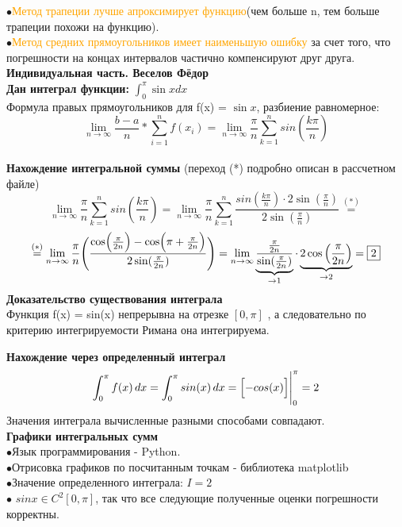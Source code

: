 \documentclass[aspectratio=169]{beamer}
\begin{document}
	$\bullet$\textcolor{orange}{Метод трапеции лучше апроксимирует функцию}(чем больше n, тем больше трапеции похожи на функцию).\\
	$\bullet$\textcolor{orange}{Метод средних прямоугольников имеет наименьшую ошибку} за счет того, что погрешности на концах интервалов частично компенсируют друг друга.
	\newpage
	\large \textbf{\textcolor{structure.fg}{Индивидуальная часть. Веселов Фёдор}}\\
	
	\textbf{Дан интеграл функции: } \(\int_{0}^{\pi}  \sin{x} dx\)\\
	Формула правых прямоугольников для f(x) = $\sin{x}$, разбиение равномерное:\\
	\[\lim_{n \to \infty}\frac{b-a}{n}*\sum_{i=1}^{n}f(x_i) = \lim_{n \to \infty}\frac{\pi}{n}\sum_{k=1}^n sin(\frac{k\pi}{n})\]\\
	\textbf{Нахождение интегральной суммы} (переход (*) подробно описан в рассчетном файле)
	\[
	\lim_{n \to \infty} \frac{\pi}{n}\sum_{k=1}^n sin(\frac{k\pi}{n}) =
	\lim_{n \to \infty} \frac{\pi}{n}\sum_{k=1}^n \frac{sin(\frac{k\pi}{n})\cdot2\sin(\frac{\pi}{n})}{2\sin(\frac{\pi}{n})} 
	\overset{(*)}{=}\]\[\overset{(*)}{=}\lim_{n \to \infty} \frac{\pi}{n}\Biggl( 
	\frac{\cos\Bigl(\frac{\pi}{2n}\Bigr) - \cos\Bigl(\pi+\frac{\pi}{2n}\Bigr)}{2\sin(\frac{\pi}{2n})} \Biggr) = \lim_{n \to \infty} \underbrace{\frac{\frac{\pi}{2n}}{\sin(\frac{\pi}{2n})}}_{\to1} \cdot 
	\underbrace{2\cos\left(\frac{\pi}{2n}\right)}_{\to 2} = \boxed{2}
	\]
	\newpage
	\textbf{Доказательство существования интеграла}\\
	Функция f(x) = sin(x) непрерывна на отрезке  $[0,\pi]$ , а следовательно по критерию интегрируемости Римана она интегрируема.
	
	\textbf{Нахождение через определенный интеграл}
	\[
	\int_0^\pi f(x) \, dx = \int_0^\pi sin(x) \, dx = \Bigl[-cos(x)\Bigr]\Bigg|_0^\pi = 2 
	\]
	Значения интеграла вычисленные разными способами совпадают.\\
	\large \textbf{\textcolor{structure.fg}{Графики интегральных сумм}}\\
		$\bullet$Язык программирования - Python.\\
	$\bullet$Отрисовка графиков по посчитанным точкам - библиотека matplotlib\\
	$\bullet$Значение определенного интеграла: \(I=2\)\\[1cm]
	$\bullet$	\(sin{x} \in C^2[0, \pi]\), так что все следующие полученные оценки погрешности корректны. 
	\newpage
	
\end{document}

